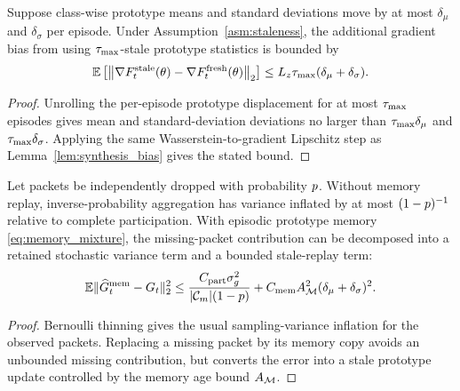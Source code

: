 \begin{lemma}\label{lem:stale_drift}
Suppose class-wise prototype means and standard deviations move by at most $\delta_{\mu}$ and $\delta_{\sigma}$ per episode. Under Assumption~\ref{asm:staleness}, the additional gradient bias from using $\tau_{\max}$-stale prototype statistics is bounded by
\begin{equation}
    \mathbb{E}\left[
    \left\|
    \nabla F_t^{\mathrm{stale}}(\theta)
    -
    \nabla F_t^{\mathrm{fresh}}(\theta)
    \right\|_2
    \right]
    \leq
    L_z \tau_{\max}(\delta_{\mu}+\delta_{\sigma}).
\end{equation}
\end{lemma}
\begin{proof}
Unrolling the per-episode prototype displacement for at most $\tau_{\max}$ episodes gives mean and standard-deviation deviations no larger than $\tau_{\max}\delta_{\mu}$ and $\tau_{\max}\delta_{\sigma}$. Applying the same Wasserstein-to-gradient Lipschitz step as Lemma~\ref{lem:synthesis_bias} gives the stated bound.
\end{proof}

\begin{lemma}\label{lem:missing_update}
Let packets be independently dropped with probability $p$. Without memory replay, inverse-probability aggregation has variance inflated by at most $(1-p)^{-1}$ relative to complete participation. With episodic prototype memory \eqref{eq:memory_mixture}, the missing-packet contribution can be decomposed into a retained stochastic variance term and a bounded stale-replay term:
\begin{equation}
    \mathbb{E}\|\widehat{G}_{t}^{\mathrm{mem}}-G_t\|_2^2
    \leq
    \frac{C_{\mathrm{part}}\sigma_g^2}{|\mathcal{C}_{m}|(1-p)}
    +
    C_{\mathrm{mem}}A_{\mathcal{M}}^2(\delta_{\mu}+\delta_{\sigma})^2 .
\end{equation}
\end{lemma}
\begin{proof}
Bernoulli thinning gives the usual sampling-variance inflation for the observed packets. Replacing a missing packet by its memory copy avoids an unbounded missing contribution, but converts the error into a stale prototype update controlled by the memory age bound $A_{\mathcal{M}}$.
\end{proof}

